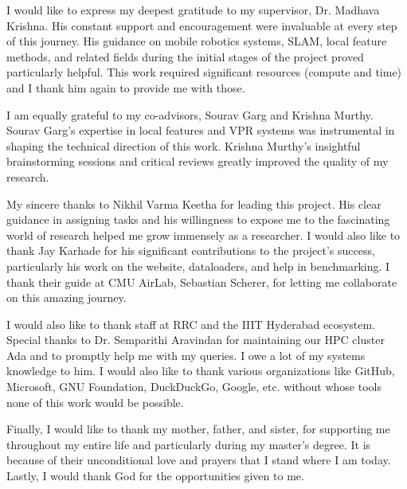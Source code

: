 

I would like to express my deepest gratitude to my supervisor, Dr.
Madhava Krishna. His constant support and encouragement were
invaluable at every step of this journey.  His guidance on mobile
robotics systems, SLAM, local feature methods, and related fields
during the initial stages of the project proved particularly helpful.
This work required significant resources (compute and time) and I
thank him again to provide me with those.

I am equally grateful to my co-advisors, Sourav Garg and Krishna
Murthy.  Sourav Garg's expertise in local features and VPR systems was
instrumental in shaping the technical direction of this work. Krishna
Murthy's insightful brainstorming sessions and critical reviews
greatly improved the quality of my research. 

My sincere thanks to Nikhil Varma Keetha for leading this project.
His clear guidance in assigning tasks and his willingness to expose me
to the fascinating world of research helped me grow immensely as a
researcher. I would also like to thank Jay Karhade for his significant
contributions to the project's success, particularly his work on the
website, dataloaders, and help in benchmarking. I thank their guide
at CMU AirLab, Sebastian Scherer, for letting me collaborate on this
amazing journey.

I would also like to thank staff at RRC and the IIIT Hyderabad
ecosystem. Special thanks to Dr. Semparithi Aravindan for maintaining
our HPC cluster Ada and to promptly help me with my queries. I owe a
lot of my systems knowledge to him. I would also like to thank various
organizations like GitHub, Microsoft, GNU Foundation, DuckDuckGo,
Google, etc. without whose tools none of this work would be possible.

Finally, I would like to thank my mother, father, and sister, for
supporting me throughout my entire life and particularly during my
master's degree. It is because of their unconditional love and prayers
that I stand where I am today. Lastly, I would thank God for the 
opportunities given to me.
